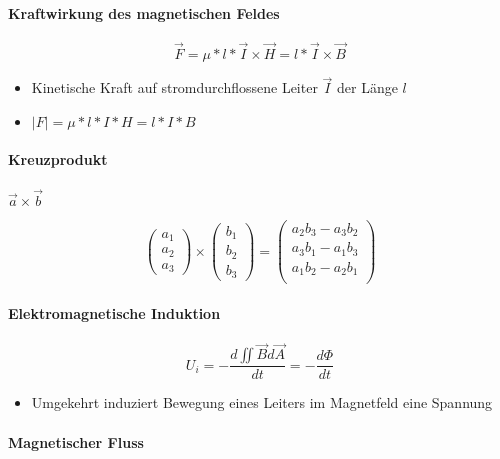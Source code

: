 \paragraph{Kraftwirkung des magnetischen Feldes}

$$\vec{F} = \mu * l * \vec{I} \times \vec{H} = l * \vec{I} \times \vec{B}$$

\begin{itemize}
  \item Kinetische Kraft auf stromdurchflossene Leiter $\vec{I}$ der Länge $l$
  \item $|F| = \mu * l * I * H = l * I * B$
\end{itemize}

\paragraph{Kreuzprodukt} $\vec{a} \times \vec{b}$

$$\begin{pmatrix}
    a_1 \\ a_2 \\ a_3
  \end{pmatrix} \times \begin{pmatrix}
    b_1 \\ b_2 \\ b_3
  \end{pmatrix} = \begin{pmatrix}
    a_2b_3 - a_3b_2 \\
    a_3b_1 - a_1b_3 \\
    a_1b_2 - a_2b_1 \\
  \end{pmatrix}$$

\paragraph{Elektromagnetische Induktion}

$$U_i = - \frac{d \iint \vec{B} d\vec{A}}{dt} = - \frac{d \Phi}{dt}$$

\begin{itemize}
  \item Umgekehrt induziert Bewegung eines Leiters im Magnetfeld eine Spannung
\end{itemize}

\paragraph{Magnetischer Fluss}

